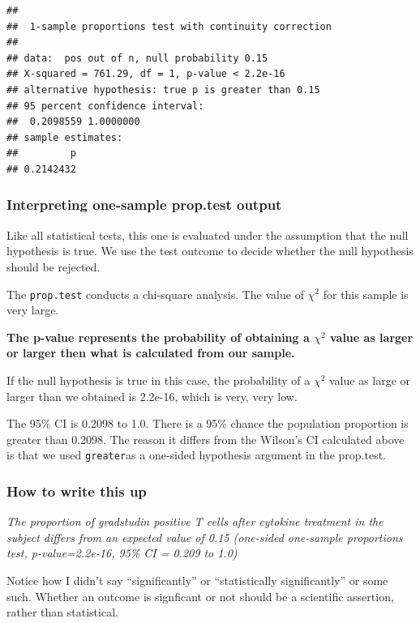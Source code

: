 \documentclass[]{book}
\begin{document}
\begin{verbatim}
## 
##  1-sample proportions test with continuity correction
## 
## data:  pos out of n, null probability 0.15
## X-squared = 761.29, df = 1, p-value < 2.2e-16
## alternative hypothesis: true p is greater than 0.15
## 95 percent confidence interval:
##  0.2098559 1.0000000
## sample estimates:
##         p 
## 0.2142432
\end{verbatim}

\hypertarget{interpreting-one-sample-prop.test-output}{%
\subsubsection{Interpreting one-sample prop.test output}\label{interpreting-one-sample-prop.test-output}}

Like all statistical tests, this one is evaluated under the assumption that the null hypothesis is true. We use the test outcome to decide whether the null hypothesis should be rejected.

The \texttt{prop.test} conducts a chi-square analysis. The value of \(\chi^2\) for this sample is very large.

\textbf{The p-value represents the probability of obtaining a \(\chi^2\) value as larger or larger then what is calculated from our sample.}

If the null hypothesis is true in this case, the probability of a \(\chi^2\) value as large or larger than we obtained is 2.2e-16, which is very, very low.

The 95\% CI is 0.2098 to 1.0. There is a 95\% chance the population proportion is greater than 0.2098. The reason it differs from the Wilson's CI calculated above is that we used \texttt{greater}as a one-sided hypothesis argument in the prop.test.

\hypertarget{how-to-write-this-up}{%
\subsubsection{How to write this up}\label{how-to-write-this-up}}

\emph{The proportion of gradstudin positive T cells after cytokine treatment in the subject differs from an expected value of 0.15 (one-sided one-sample proportions test, p-value=2.2e-16, 95\% CI = 0.209 to 1.0)}

Notice how I didn't say ``significantly'' or ``statistically significantly'' or some such. Whether an outcome is signficant or not should be a scientific assertion, rather than statistical.
\end{document}
